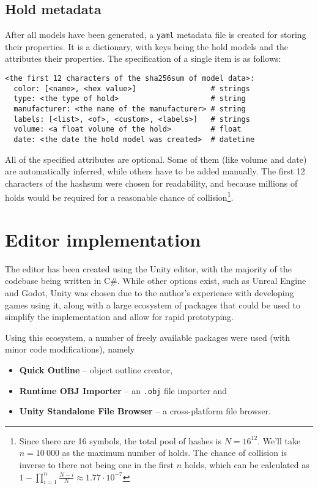 \subsection{Hold metadata}
After all models have been generated, a \verb|yaml| metadata file is created for storing their properties.
It is a dictionary, with keys being the hold models and the attributes their properties.
The specification of a single item is as follows:

\begin{verbatim}
<the first 12 characters of the sha256sum of model data>:
  color: [<name>, <hex value>]                 # strings
  type: <the type of hold>                     # string
  manufacturer: <the name of the manufacturer> # string
  labels: [<list>, <of>, <custom>, <labels>]   # strings
  volume: <a float volume of the hold>         # float
  date: <the date the hold model was created>  # datetime
\end{verbatim}

All of the specified attributes are optional.
Some of them (like volume and date) are automatically inferred, while others have to be added manually.
The first 12 characters of the hashsum were chosen for readability, and because millions of holds would be required for a reasonable chance of collision\footnote{Since there are 16 symbols, the total pool of hashes is $N = 16^{12}$. We'll take $n = 10\ 000$ as the maximum number of holds. The chance of collision is inverse to there not being one in the first $n$ holds, which can be calculated as $1 - \prod_{i = 1}^{n} \frac{N - i}{N} \approx 1.77 \cdot 10^{-7}$}.

\section{Editor implementation}
The editor has been created using the Unity editor, with the majority of the codebase being written in C\#.
While other options exist, such as Unreal Engine and Godot, Unity was chosen due to the author's experience with developing games using it, along with a large ecosystem of packages that could be used to simplify the implementation and allow for rapid prototyping.

Using this ecosystem, a number of freely available packages were used (with minor code modifications), namely

\begin{itemize}
	\item \textbf{Quick Outline} \cite{quickoutline} -- object outline creator,
	\item \textbf{Runtime OBJ Importer} \cite{objimport} -- an \verb|.obj| file importer and
	\item \textbf{Unity Standalone File Browser} \cite{unitystandalonefilebrowser} -- a cross-platform file browser.
\end{itemize}

